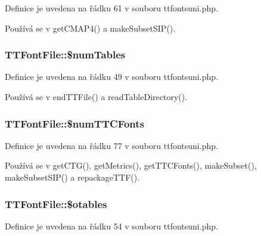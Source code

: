 Definice je uvedena na řádku 61 v souboru ttfontsuni.\-php.



Používá se v get\-C\-M\-A\-P4() a make\-Subset\-S\-I\-P().

\hypertarget{class_t_t_font_file_a44f063773f8730cd90b870b05953f814}{
\subsubsection[{\$num\-Tables}]{\setlength{\rightskip}{0pt plus 5cm}T\-T\-Font\-File\-::\$num\-Tables}}\label{class_t_t_font_file_a44f063773f8730cd90b870b05953f814}


Definice je uvedena na řádku 49 v souboru ttfontsuni.\-php.



Používá se v end\-T\-T\-File() a read\-Table\-Directory().

\hypertarget{class_t_t_font_file_a4e1d77cee415df492659fee900ea4562}{
\subsubsection[{\$num\-T\-T\-C\-Fonts}]{\setlength{\rightskip}{0pt plus 5cm}T\-T\-Font\-File\-::\$num\-T\-T\-C\-Fonts}}\label{class_t_t_font_file_a4e1d77cee415df492659fee900ea4562}


Definice je uvedena na řádku 77 v souboru ttfontsuni.\-php.



Používá se v get\-C\-T\-G(), get\-Metrics(), get\-T\-T\-C\-Fonts(), make\-Subset(), make\-Subset\-S\-I\-P() a repackage\-T\-T\-F().

\hypertarget{class_t_t_font_file_ab13a17ab1c63ec1b80ba65fb48217698}{
\subsubsection[{\$otables}]{\setlength{\rightskip}{0pt plus 5cm}T\-T\-Font\-File\-::\$otables}}\label{class_t_t_font_file_ab13a17ab1c63ec1b80ba65fb48217698}


Definice je uvedena na řádku 54 v souboru ttfontsuni.\-php.



